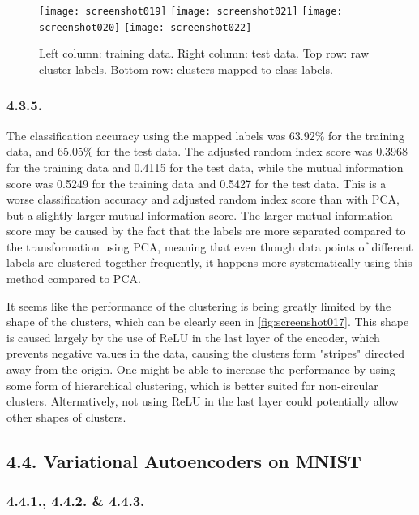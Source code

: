 \documentclass[a4paper, 12pt]{article}
\begin{document}
\begin{figure}[H]
	\centering
	\texttt{[image: screenshot019]}
	\texttt{[image: screenshot021]}
	\texttt{[image: screenshot020]}
	\texttt{[image: screenshot022]}
	\caption{Left column: training data. Right column: test data. Top row: raw cluster labels. Bottom row: clusters mapped to class labels.}
	\label{fig:screenshot019}
\end{figure}

\subsubsection{4.3.5.}

The classification accuracy using the mapped labels was 63.92\% for the training data, and 65.05\% for the test data. The adjusted random index score was 0.3968 for the training data and 0.4115 for the test data, while the mutual information score was 0.5249 for the training data and 0.5427 for the test data. This is a worse classification accuracy and adjusted random index score than with PCA, but a slightly larger mutual information score. The larger mutual information score may be caused by the fact that the labels are more separated compared to the transformation using PCA, meaning that even though data points of different labels are clustered together frequently, it happens more systematically using this method compared to PCA.

It seems like the performance of the clustering is being greatly limited by the shape of the clusters, which can be clearly seen in \autoref{fig:screenshot017}. This shape is caused largely by the use of ReLU in the last layer of the encoder, which prevents negative values in the data, causing the clusters form "stripes" directed away from the origin. One might be able to increase the performance by using some form of hierarchical clustering, which is better suited for non-circular clusters. Alternatively, not using ReLU in the last layer could potentially allow other shapes of clusters.

\subsection{4.4. Variational Autoencoders on MNIST}

\subsubsection{4.4.1., 4.4.2. \& 4.4.3.}
\end{document}
